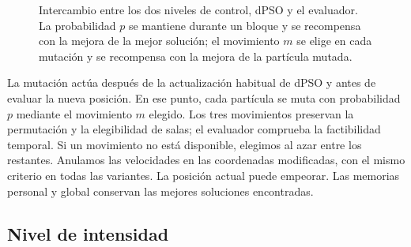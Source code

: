 \documentclass[10pt,a4paper]{article}
\begin{document}
\begin{figure}[t]
\centering
{}
\caption{Intercambio entre los dos niveles de control, dPSO y el evaluador. La probabilidad $p$
se mantiene durante un bloque y se recompensa con la mejora de la mejor solución; el
movimiento $m$ se elige en cada mutación y se recompensa con la mejora de la partícula mutada.}
\label{fig:arq}
\end{figure}

La mutación actúa después de la actualización habitual de dPSO y antes de evaluar la nueva
posición. En ese punto, cada partícula se muta con probabilidad $p$ mediante el movimiento $m$
elegido. Los tres movimientos preservan la permutación y la elegibilidad de salas; el evaluador
comprueba la factibilidad temporal. Si un movimiento no está disponible, elegimos al azar entre
los restantes. Anulamos las velocidades en las coordenadas modificadas, con el mismo criterio en
todas las variantes. La posición actual puede empeorar. Las memorias personal y global conservan
las mejores soluciones encontradas.

\subsection{Nivel de intensidad}
\end{document}
